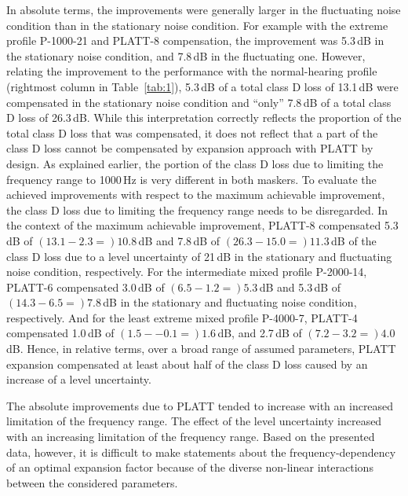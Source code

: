 \documentclass[10pt,a4paper,twocolumn]{article}
\begin{document}
In absolute terms, the improvements were generally larger in the fluctuating noise condition than in the stationary noise condition.
%
For example with the extreme profile P-1000-21 and PLATT-8 compensation, the improvement was 5.3\,dB in the stationary noise condition, and 7.8\,dB in the fluctuating one.
%
However, relating the improvement to the performance with the normal-hearing profile (rightmost column in Table~\ref{tab:1}), 5.3\,dB of a total class D loss of 13.1\,dB were compensated in the stationary noise condition and \enquote{only} 7.8\,dB of a total class D loss of 26.3\,dB.
%
While this interpretation correctly reflects the proportion of the total class D loss that was compensated, it does not reflect that a part of the class D loss cannot be compensated by expansion approach with PLATT by design. 
%
As explained earlier, the portion of the class D loss due to limiting the frequency range to 1000\,Hz is very different in both maskers.
%
To evaluate the achieved improvements with respect to the maximum achievable improvement, the class D loss due to limiting the frequency range needs to be disregarded.
%
In the context of the maximum achievable improvement, PLATT-8 compensated 5.3\,dB of $(13.1-2.3=)10.8$\,dB and 7.8\,dB of $(26.3-15.0=)11.3$\,dB of the class D loss due to a level uncertainty of 21\,dB in the stationary and fluctuating noise condition, respectively.
%
For the intermediate mixed profile P-2000-14, PLATT-6 compensated 3.0\,dB of $(6.5-1.2=)5.3$\,dB and 5.3\,dB of $(14.3-6.5=)7.8$\,dB in the stationary and fluctuating noise condition, respectively.
%
And for the least extreme mixed profile P-4000-7, PLATT-4 compensated 1.0\,dB of $(1.5-{-0.1}=)1.6$\,dB, and 2.7\,dB of $(7.2-3.2=)4.0$\,dB.
%
Hence, in relative terms, over a broad range of assumed parameters, PLATT expansion compensated at least about half of the class D loss caused by an increase of a level uncertainty.

The absolute improvements due to PLATT tended to increase with an increased limitation of the frequency range.
%
The effect of the level uncertainty increased with an increasing limitation of the frequency range.
%
Based on the presented data, however, it is difficult to make statements about the frequency-dependency of an optimal expansion factor because of the diverse non-linear interactions between the considered parameters.
\end{document}
